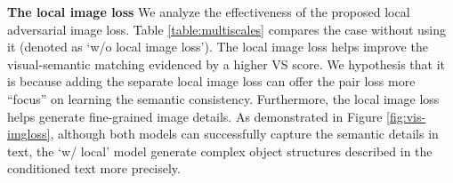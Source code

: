 \documentclass[10pt,twocolumn,letterpaper]{article}
\begin{document}

\textbf{The local image loss} We analyze the effectiveness of the proposed local adversarial image loss. 
Table \ref{table:multiscales} compares the case without using it (denoted as `w/o local image loss').
The local image loss helps improve the visual-semantic matching evidenced by a higher VS score. We hypothesis that it is because adding the separate local image loss can offer the pair loss more ``focus'' on learning the semantic consistency. 
Furthermore, the local image loss helps generate fine-grained image details. As demonstrated in Figure \ref{fig:vis-imgloss}, although both models can successfully capture the semantic details in text, the `w/ local' model generate complex object structures described in the conditioned text more precisely. 




%			
\end{document}
